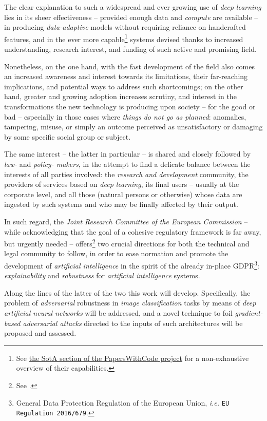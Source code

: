 The clear explanation to such a widespread and ever growing use of \textit{deep learning} lies in its sheer effectiveness -- provided enough data and \textit{compute} are available -- in producing \textit{data-adaptive} models without requiring reliance on handcrafted features, and in the ever more capable\footnote{See \href{https://paperswithcode.com/sota}{the SotA section of the {PapersWithCode} project} for a non-exhaustive overview of their capabilities.} systems devised thanks to increased understanding, research interest, and funding of such active and promising field.

Nonetheless, on the one hand, with the fast development of the field also comes an increased awareness and interest towards its limitations, their far-reaching implications, and potential ways to address such shortcomings; on the other hand, greater and growing adoption increases scrutiny, and interest in the transformations the new technology is producing upon society -- for the good or bad -- especially in those cases where \textit{things do not go as planned}: anomalies, tampering, misuse, or simply an outcome perceived as unsatisfactory or damaging by some specific social group or subject.

The same interest -- the latter in particular -- is shared and closely followed by \textit{law-} and \textit{policy- makers}, in the attempt to find a delicate balance between the interests of all parties involved: the \textit{research and development} community, the providers of services based on \textit{deep learning}, its final users -- usually at the corporate level, and all those (natural persons or otherwise) whose data are ingested by such systems and who may be finally affected by their output.

In such regard, the \textit{Joint Research Committee of the European Commission} -- while acknowledging that the goal of a cohesive regulatory framework is far away, but urgently needed -- offers\footnote{See \cite{HamonEtAl2020Europe}.} two crucial directions for both the technical and legal community to follow, in order to ease normation and promote the development of \textit{artificial intelligence} in the spirit of the already in-place GDPR\footnote{General Data Protection Regulation of the European Union, \textit{i.e.} \texttt{EU Regulation 2016/679}.}: \textit{explainability} and \textit{robustness} for \textit{artificial intelligence} systems.

Along the lines of the latter of the two this work will develop. Specifically, the problem of \textit{adversarial} robustness in \textit{image classification} tasks by means of \textit{deep artificial neural networks} will be addressed, and a novel technique to foil \textit{gradient-based adversarial attacks} directed to the inputs of such architectures will be proposed and assessed.

